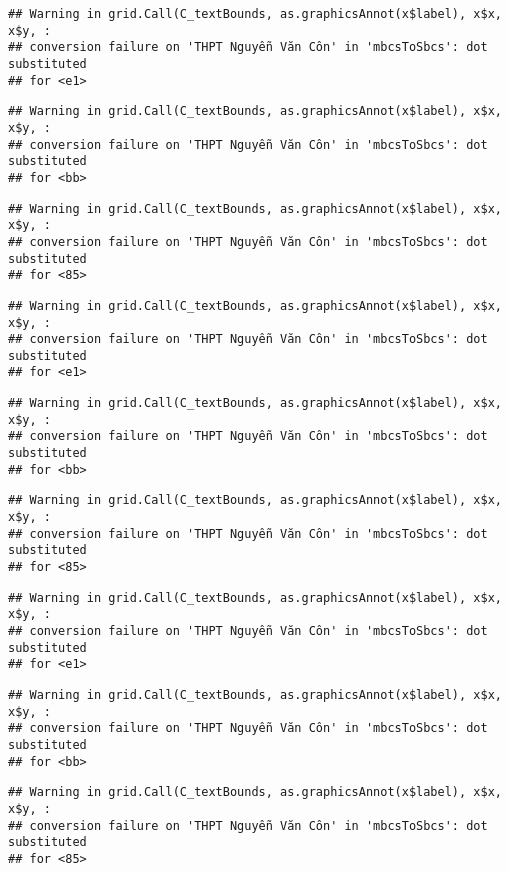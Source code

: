 \documentclass[
]{article}
\begin{document}
\begin{verbatim}
## Warning in grid.Call(C_textBounds, as.graphicsAnnot(x$label), x$x, x$y, :
## conversion failure on 'THPT Nguyễn Văn Côn' in 'mbcsToSbcs': dot substituted
## for <e1>
\end{verbatim}

\begin{verbatim}
## Warning in grid.Call(C_textBounds, as.graphicsAnnot(x$label), x$x, x$y, :
## conversion failure on 'THPT Nguyễn Văn Côn' in 'mbcsToSbcs': dot substituted
## for <bb>
\end{verbatim}

\begin{verbatim}
## Warning in grid.Call(C_textBounds, as.graphicsAnnot(x$label), x$x, x$y, :
## conversion failure on 'THPT Nguyễn Văn Côn' in 'mbcsToSbcs': dot substituted
## for <85>
\end{verbatim}

\begin{verbatim}
## Warning in grid.Call(C_textBounds, as.graphicsAnnot(x$label), x$x, x$y, :
## conversion failure on 'THPT Nguyễn Văn Côn' in 'mbcsToSbcs': dot substituted
## for <e1>
\end{verbatim}

\begin{verbatim}
## Warning in grid.Call(C_textBounds, as.graphicsAnnot(x$label), x$x, x$y, :
## conversion failure on 'THPT Nguyễn Văn Côn' in 'mbcsToSbcs': dot substituted
## for <bb>
\end{verbatim}

\begin{verbatim}
## Warning in grid.Call(C_textBounds, as.graphicsAnnot(x$label), x$x, x$y, :
## conversion failure on 'THPT Nguyễn Văn Côn' in 'mbcsToSbcs': dot substituted
## for <85>
\end{verbatim}

\begin{verbatim}
## Warning in grid.Call(C_textBounds, as.graphicsAnnot(x$label), x$x, x$y, :
## conversion failure on 'THPT Nguyễn Văn Côn' in 'mbcsToSbcs': dot substituted
## for <e1>
\end{verbatim}

\begin{verbatim}
## Warning in grid.Call(C_textBounds, as.graphicsAnnot(x$label), x$x, x$y, :
## conversion failure on 'THPT Nguyễn Văn Côn' in 'mbcsToSbcs': dot substituted
## for <bb>
\end{verbatim}

\begin{verbatim}
## Warning in grid.Call(C_textBounds, as.graphicsAnnot(x$label), x$x, x$y, :
## conversion failure on 'THPT Nguyễn Văn Côn' in 'mbcsToSbcs': dot substituted
## for <85>
\end{verbatim}
\end{document}
